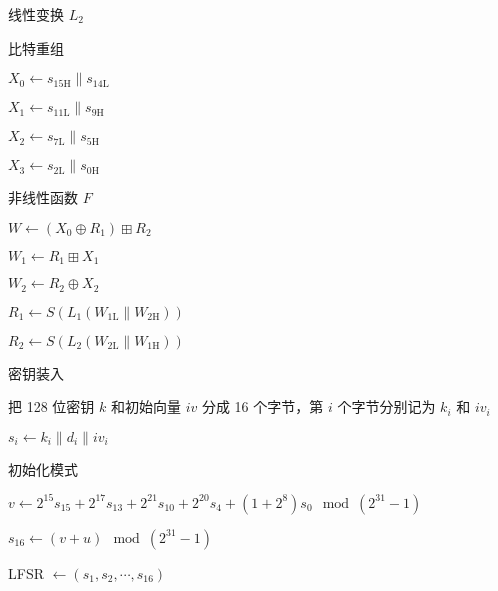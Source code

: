 \documentclass[a4paper, 10pt]{article}
\begin{document}
\begin{algorithm}
\caption{线性变换 $ L_2 $}

\end{algorithm}

\begin{algorithm}
\caption{比特重组}

$ X_0 \leftarrow s_\mathrm{15H} \parallel s_\mathrm{14L} $

$ X_1 \leftarrow s_\mathrm{11L} \parallel s_\mathrm{9H} $

$ X_2 \leftarrow s_\mathrm{7L} \parallel s_\mathrm{5H} $

$ X_3 \leftarrow s_\mathrm{2L} \parallel s_\mathrm{0H} $

\end{algorithm}


\begin{algorithm}
\caption{非线性函数 $ F $}

$ W \leftarrow (X_0 \oplus R_1) \boxplus R_2 $

$ W_1 \leftarrow R_1 \boxplus X_1 $

$ W_2 \leftarrow R_2 \oplus X_2 $

$ R_1 \leftarrow S(L_1(W_\mathrm{1L} \parallel W_\mathrm{2H})) $

$ R_2 \leftarrow S(L_2(W_\mathrm{2L} \parallel W_\mathrm{1H})) $

\end{algorithm}

\begin{algorithm}
\caption{密钥装入} 

把 128 位密钥 $ k $ 和初始向量 $ iv $ 分成 16 个字节，第 $ i $ 个字节分别记为 $ k_i $ 和 $ iv_i $

$ s_i \leftarrow k_i \parallel d_i \parallel iv_i $
\end{algorithm}

\begin{algorithm}
\caption{初始化模式}

$ v \leftarrow 2^{15} s_{15} + 2^{17} s_{13} + 2^{21} s_{10} + 2^{20} s_{4} + (1 + 2^{8}) s_{0} \mod (2^{31} - 1) $

$ s_{16} \leftarrow (v + u) \mod (2^{31} - 1) $


LFSR $ \leftarrow (s_1, s_2, \cdots, s_{16}) $
\end{algorithm}
\end{document}
